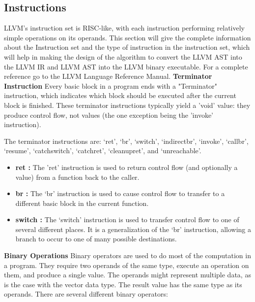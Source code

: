 \documentclass{book}
\begin{document}
	\subsection{Instructions}
	LLVM's instruction set is RISC-like, with each instruction performing relatively simple operations on its operands. This section will give the complete information about the Instruction set and the type of instruction in the instruction set, which will help in making the design of the algorithm to convert the LLVM AST into the LLVM IR and LLVM AST into the LLVM binary executable. For a complete reference go to the LLVM Language Reference Manual.\newline \newline
	\textbf{Terminator Instruction} \newline \newline
	Every basic block in a program ends with a "Terminator"  instruction, which indicates which block should be executed after the current block is finished. These terminator instructions typically yield a 'void' value: they produce control flow, not values (the one exception being the 'invoke' instruction).\newline
	
	The terminator instructions are: `ret',  `br', `switch', `indirectbr', `invoke', `callbr', `resume', `catchswitch', `catchret', `cleanupret', and `unreachable'.
	
	\begin{itemize}
		\item \textbf{ret :} The 'ret' instruction is used to return control flow (and optionally a value) from a function back to the caller.
		\item \textbf{br :} The `br' instruction is used to cause control flow to transfer to a different basic block in the current function.
		\item \textbf{switch :} The `switch' instruction is used to transfer control flow to one of several different places. It is a generalization of the `br' instruction, allowing a branch to occur to one of many possible destinations.  
	\end{itemize}

	\textbf{Binary Operations} \newline \newline
	Binary operators are used to do most of the computation in a program. They require two operands of the same type, execute an operation on them, and produce a single value. The operands might represent multiple data, as is the case with the vector data type. The result value has the same type as its operands.\newpage
	There are several different binary operators:
	
\end{document}
